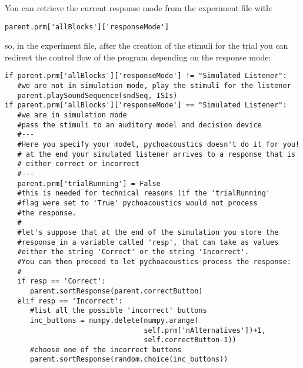 You can retrieve the current response mode from the experiment file with:
\begin{lstlisting}[stepnumber=0]
parent.prm['allBlocks']['responseMode']
\end{lstlisting}
so, in the experiment file, after the creation of the stimuli for the trial you can redirect the
control flow of the program depending on the response mode:
\begin{lstlisting}
if parent.prm['allBlocks']['responseMode'] != "Simulated Listener":
   #we are not in simulation mode, play the stimuli for the listener
   parent.playSoundSequence(sndSeq, ISIs)
if parent.prm['allBlocks']['responseMode'] == "Simulated Listener":
   #we are in simulation mode
   #pass the stimuli to an auditory model and decision device
   #---
   #Here you specify your model, pychoacoustics doesn't do it for you!
   # at the end your simulated listener arrives to a response that is
   # either correct or incorrect
   #---
   parent.prm['trialRunning'] = False 
   #this is needed for technical reasons (if the 'trialRunning'
   #flag were set to 'True' pychoacoustics would not process
   #the response.
   #
   #let's suppose that at the end of the simulation you store the
   #response in a variable called 'resp', that can take as values 
   #either the string 'Correct' or the string 'Incorrect'.
   #You can then proceed to let pychoacoustics process the response:
   #
   if resp == 'Correct':
      parent.sortResponse(parent.correctButton) 
   elif resp == 'Incorrect':
      #list all the possible 'incorrect' buttons
      inc_buttons = numpy.delete(numpy.arange(
                                 self.prm['nAlternatives'])+1, 
                                 self.correctButton-1))
      #choose one of the incorrect buttons
      parent.sortResponse(random.choice(inc_buttons))

\end{lstlisting}

